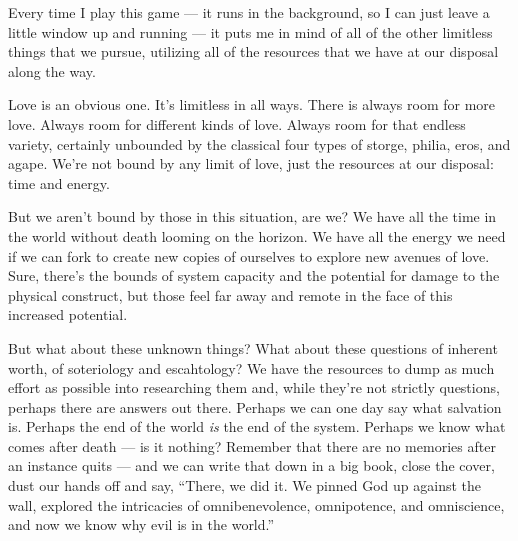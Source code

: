 Every time I play this game --- it runs in the background, so I can just leave a little window up and running --- it puts me in mind of all of the other limitless things that we pursue, utilizing all of the resources that we have at our disposal along the way.

Love is an obvious one. It's limitless in all ways. There is always room for more love. Always room for different kinds of love. Always room for that endless variety, certainly unbounded by the classical four types of storge, philia, eros, and agape. We're not bound by any limit of love, just the resources at our disposal: time and energy.

But we aren't bound by those in this situation, are we? We have all the time in the world without death looming on the horizon. We have all the energy we need if we can fork to create new copies of ourselves to explore new avenues of love. Sure, there's the bounds of system capacity and the potential for damage to the physical construct, but those feel far away and remote in the face of this increased potential.

But what about these unknown things? What about these questions of inherent worth, of soteriology and escahtology? We have the resources to dump as much effort as possible into researching them and, while they're not strictly questions, perhaps there are answers out there. Perhaps we can one day say what salvation is. Perhaps the end of the world \emph{is} the end of the system. Perhaps we know what comes after death --- is it nothing? Remember that there are no memories after an instance quits --- and we can write that down in a big book, close the cover, dust our hands off and say, ``There, we did it. We pinned God up against the wall, explored the intricacies of omnibenevolence, omnipotence, and omniscience, and now we know why evil is in the world.''
